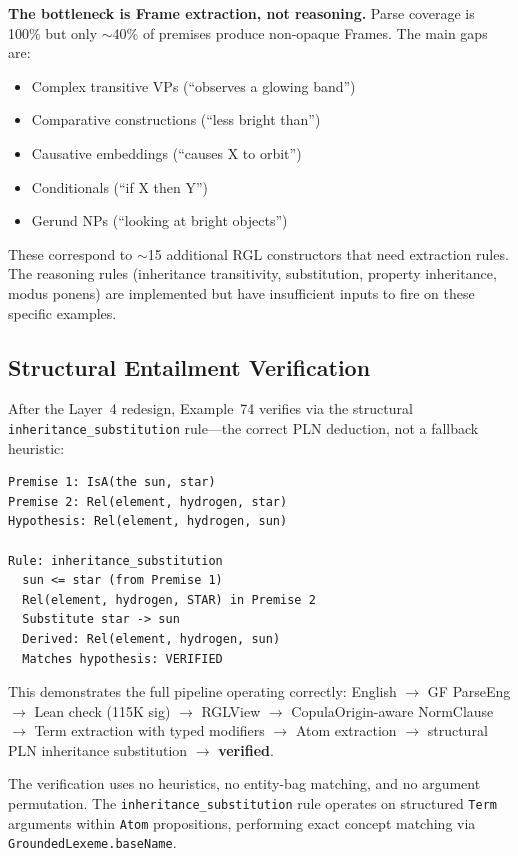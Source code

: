\documentclass[]{article}
\newcommand{\code}[1]{\texttt{#1}}
\begin{document}
\textbf{The bottleneck is Frame extraction, not reasoning.} Parse
coverage is 100\% but only $\sim$40\% of premises produce non-opaque
Frames. The main gaps are:

\begin{itemize}
\item Complex transitive VPs (``observes a glowing band'')
\item Comparative constructions (``less bright than'')
\item Causative embeddings (``causes X to orbit'')
\item Conditionals (``if X then Y'')
\item Gerund NPs (``looking at bright objects'')
\end{itemize}

These correspond to $\sim$15 additional RGL constructors that need
extraction rules. The reasoning rules (inheritance transitivity,
substitution, property inheritance, modus ponens) are implemented but
have insufficient inputs to fire on these specific examples.

\subsection{Structural Entailment Verification}

After the Layer~4 redesign, Example~74 verifies via the structural
\code{inheritance\_substitution} rule---the correct PLN deduction,
not a fallback heuristic:

\begin{lstlisting}
Premise 1: IsA(the sun, star)
Premise 2: Rel(element, hydrogen, star)
Hypothesis: Rel(element, hydrogen, sun)

Rule: inheritance_substitution
  sun <= star (from Premise 1)
  Rel(element, hydrogen, STAR) in Premise 2
  Substitute star -> sun
  Derived: Rel(element, hydrogen, sun)
  Matches hypothesis: VERIFIED
\end{lstlisting}

This demonstrates the full pipeline operating correctly:
English $\to$ GF ParseEng $\to$ Lean check (115K sig) $\to$ RGLView
$\to$ CopulaOrigin-aware NormClause $\to$ Term extraction with typed
modifiers $\to$ Atom extraction $\to$ structural PLN inheritance
substitution $\to$ \textbf{verified}.

The verification uses no heuristics, no entity-bag matching, and no
argument permutation. The \code{inheritance\_substitution} rule operates
on structured \code{Term} arguments within \code{Atom} propositions,
performing exact concept matching via \code{GroundedLexeme.baseName}.
\end{document}
